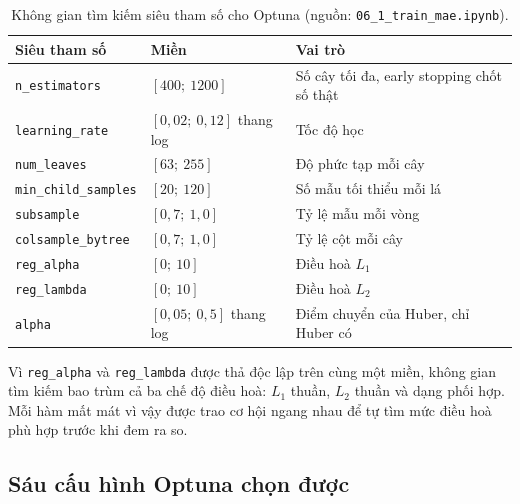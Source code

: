 \begin{table}[htbp]
\centering
\caption{Không gian tìm kiếm siêu tham số cho Optuna (nguồn: \texttt{06\_1\_train\_mae.ipynb}).}
\label{tab:mien_optuna}
\small
\begin{tabular}{l l l}
\toprule
\textbf{Siêu tham số} & \textbf{Miền} & \textbf{Vai trò} \\
\midrule
\texttt{n\_estimators}     & $[400;\ 1200]$ & Số cây tối đa, early stopping chốt số thật \\
\texttt{learning\_rate}    & $[0{,}02;\ 0{,}12]$ thang log & Tốc độ học \\
\texttt{num\_leaves}       & $[63;\ 255]$ & Độ phức tạp mỗi cây \\
\texttt{min\_child\_samples} & $[20;\ 120]$ & Số mẫu tối thiểu mỗi lá \\
\texttt{subsample}         & $[0{,}7;\ 1{,}0]$ & Tỷ lệ mẫu mỗi vòng \\
\texttt{colsample\_bytree} & $[0{,}7;\ 1{,}0]$ & Tỷ lệ cột mỗi cây \\
\texttt{reg\_alpha}        & $[0;\ 10]$ & Điều hoà $L_1$ \\
\texttt{reg\_lambda}       & $[0;\ 10]$ & Điều hoà $L_2$ \\
\texttt{alpha}             & $[0{,}05;\ 0{,}5]$ thang log & Điểm chuyển của Huber, chỉ Huber có \\
\bottomrule
\end{tabular}
\end{table}

Vì \texttt{reg\_alpha} và \texttt{reg\_lambda} được thả độc lập trên cùng một miền, không gian
tìm kiếm bao trùm cả ba chế độ điều hoà: $L_1$ thuần, $L_2$ thuần và dạng phối hợp. Mỗi hàm mất
mát vì vậy được trao cơ hội ngang nhau để tự tìm mức điều hoà phù hợp trước khi đem ra so.

\FloatBarrier
\subsection{Sáu cấu hình Optuna chọn được}

